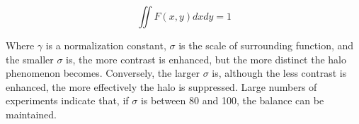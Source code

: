 \begin{equation}
	\iint F(x,y)dxdy = 1
	\label{fig:ssr2}
\end{equation}


Where $\gamma$ is a normalization constant, $\sigma$ is the scale of surrounding function, and the smaller $\sigma$ is, the more contrast is enhanced, but the more distinct the halo phenomenon becomes.
Conversely, the larger $\sigma$ is, although the less contrast is enhanced, the more effectively the halo is suppressed. Large numbers of experiments indicate that, if $\sigma$ is between 80 and 100, the balance can be maintained.



